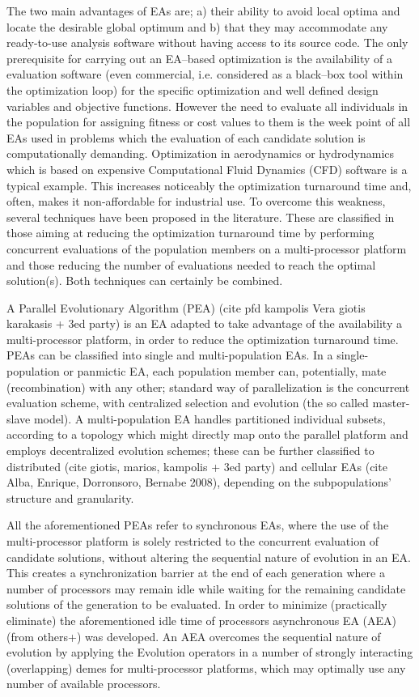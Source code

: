 The two main advantages of EAs are; a) their ability to avoid local optima and locate the desirable global optimum and b) that they may accommodate any ready-to-use analysis software without having access to its source code. The only prerequisite for carrying out an EA–based optimization is the availability of a evaluation software (even commercial, i.e. considered as a black–box tool within the optimization loop) for the specific optimization  and well defined design variables and objective functions. However the need to evaluate all individuals in the population for assigning fitness or cost values to them is the week point of all EAs used in problems which the evaluation of each candidate solution is computationally demanding. Optimization in aerodynamics or hydrodynamics which is based on expensive Computational Fluid Dynamics (CFD) software is a typical example.  This increases noticeably the optimization turnaround time and, often, makes it non-affordable for industrial use. To overcome this weakness, several techniques have been proposed in the literature. These  are classified in those aiming at reducing the optimization turnaround time by performing concurrent evaluations of the population members on a multi-processor platform and those reducing the number of evaluations needed to reach the optimal solution(s). Both techniques can certainly be combined.   

A Parallel Evolutionary Algorithm (PEA) (cite pfd kampolis Vera giotis karakasis + 3ed party) is an EA adapted to take advantage of the availability a multi-processor platform, in order to reduce the optimization turnaround time. PEAs can be classified into single and multi-population EAs. In a single-population or panmictic EA, each population member can, potentially, mate (recombination) with any other; standard way of parallelization is the concurrent evaluation scheme, with centralized selection and evolution (the so called master-slave model). A multi-population EA handles partitioned individual subsets, according to a topology which might directly map onto the parallel platform and employs decentralized evolution schemes; these can be further classified to distributed (cite giotis, marios, kampolis + 3ed party) and cellular EAs (cite Alba, Enrique, Dorronsoro, Bernabe 2008), depending on the subpopulations’ structure and granularity. 

All the aforementioned PEAs refer to synchronous EAs, where the use of the multi-processor platform is solely restricted to the concurrent evaluation of candidate solutions, without altering the sequential nature of evolution in an EA. This creates a synchronization barrier at the end of each generation where a number of processors may remain idle while waiting for the remaining candidate solutions of the generation to be evaluated.  In order to minimize (practically eliminate) the aforementioned idle time of processors asynchronous EA (AEA) (from others+\cite{LTT_2_040}) was developed. An AEA overcomes the sequential nature of evolution by applying the Evolution operators in a number of strongly interacting (overlapping) demes for multi-processor platforms, which may optimally use any number of available processors.     

